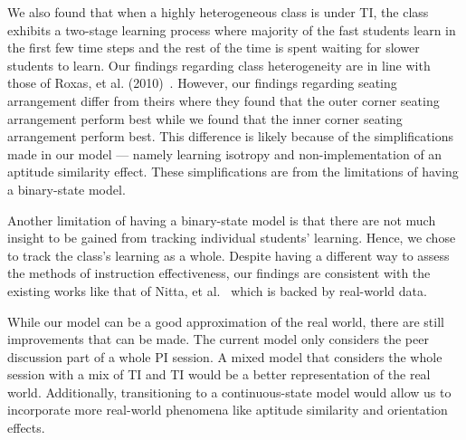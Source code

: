 \documentclass[twocolumn,secnumarabic,amssymb, nobibnotes, aps, prd]{revtex4-2}
\begin{document}
    We also found that when a highly heterogeneous class is under TI, the class exhibits a two-stage learning process where majority of the fast students learn in the first few time steps and the rest of the time is spent waiting for slower students to learn. Our findings regarding class heterogeneity are in line with those of Roxas, et al. (2010)~\cite{roxas2010seating}.
    However, our findings regarding seating arrangement differ from theirs where they found that the outer corner seating arrangement perform best while we found that the inner corner seating arrangement perform best.
    This difference is likely because of the simplifications made in our model --- namely learning isotropy and non-implementation of an aptitude similarity effect.
    These simplifications are from the limitations of having a binary-state model.

    Another limitation of having a binary-state model is that there are not much insight to be gained from tracking individual students' learning.
    Hence, we chose to track the class's learning as a whole.
    Despite having a different way to assess the methods of instruction effectiveness, our findings are consistent with the existing works like that of Nitta, et al.~\cite{nitta2019mathematical} which is backed by real-world data.

    While our model can be a good approximation of the real world, there are still improvements that can be made.
    The current model only considers the peer discussion part of a whole PI session.
    A mixed model that considers the whole session with a mix of TI and TI would be a better representation of the real world.
    Additionally, transitioning to a continuous-state model would allow us to incorporate more real-world phenomena like aptitude similarity and orientation effects.



\end{document}
